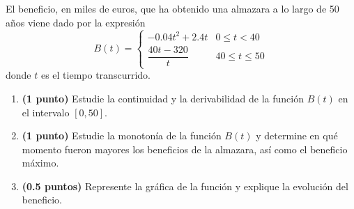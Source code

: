 
El beneficio, en miles de euros, que ha obtenido una almazara a lo largo de 50 años viene dado por la expresión
\[
B(t)=\begin{cases}
-0.04t^2+2.4t & 0\leq t<40\\[4pt]
\dfrac{40t-320}{t} & 40\leq t\leq50
\end{cases}
\]
donde $t$ es el tiempo transcurrido.
\begin{enumerate}[label=\alph*)]
\item \textbf{(1 punto)} Estudie la continuidad y la derivabilidad de la función $B(t)$ en el intervalo $[0,50]$.
\item \textbf{(1 punto)} Estudie la monotonía de la función $B(t)$ y determine en qué momento fueron mayores los beneficios de la almazara, así como el beneficio máximo.
\item \textbf{(0.5 puntos)} Represente la gráfica de la función y explique la evolución del beneficio.
\end{enumerate}
